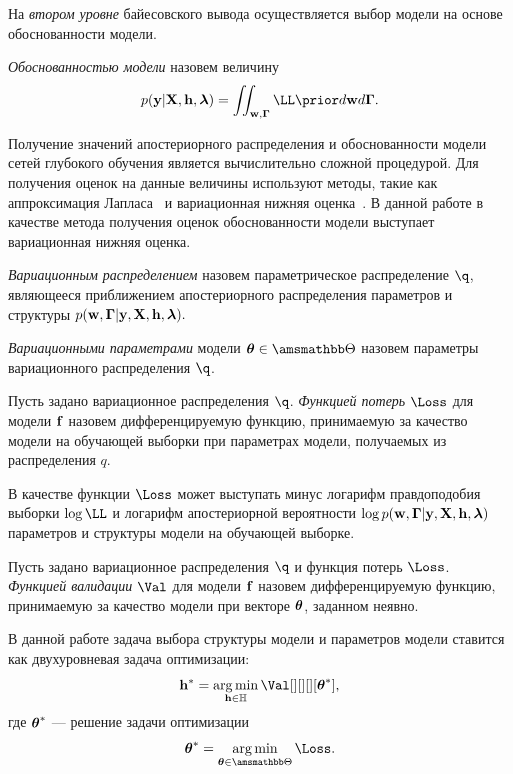 На \textit{втором уровне} байесовского вывода осуществляется выбор модели на основе обоснованности модели.
\begin{defin}
\textit{Обоснованностью модели }назовем величину
\begin{equation}
\label{eq:evidence}
\EV = \iint_{\mathbf{w}, \boldsymbol{\Gamma}} \LL \prior  d\mathbf{w}d\boldsymbol{\Gamma}.
\end{equation}
\end{defin}
Получение значений апостериорного распределения и обоснованности модели сетей глубокого обучения является вычислительно сложной процедурой. Для получения оценок на данные величины используют методы, такие как аппроксимация Лапласа~\cite{tokmakova} и вариационная нижняя оценка~\cite{nips}.  В данной работе в качестве метода получения оценок обоснованности модели выступает вариационная нижняя оценка.

\begin{defin}
\textit{Вариационным распределением} назовем параметрическое распределение $\q$, являющееся приближением  апостериорного распределения параметров и структуры $p(\mathbf{w}, \boldsymbol{\Gamma}|\mathbf{y}, \mathbf{X}, \mathbf{h},\boldsymbol{\lambda}).$ 
\end{defin}

\begin{defin}
\textit{Вариационными параметрами} модели $\teta \in \Tetab$ назовем параметры вариационного распределения $\q$.
\end{defin} 

\begin{defin}
\label{def:l}
Пусть задано вариационное распределения $\q$.
\textit{Функцией потерь} $\Loss$ для модели $\mathbf{f}$ назовем дифференцируемую функцию, принимаемую за качество модели на обучающей выборки при параметрах модели, получаемых из  распределения $q$.
\end{defin}

В качестве функции $\Loss$ может выступать минус логарифм правдоподобия выборки $\log\LL$  и логарифм апостериорной вероятности $\log p(\mathbf{w}, \boldsymbol{\Gamma}|\mathbf{y}, \mathbf{X}, \mathbf{h},\boldsymbol{\lambda})$ параметров и структуры модели на обучающей выборке.

\begin{defin}
\label{def:q}
Пусть задано вариационное распределения $\q$ и функция потерь $\Loss$. 
\textit{Функцией валидации} $\Val$ для модели $\mathbf{f}$ назовем дифференцируемую функцию, принимаемую за качество модели при векторе $\boldsymbol{\theta}$, заданном неявно.
\end{defin}

 

В данной работе задача выбора структуры модели и параметров модели ставится как двухуровневая задача оптимизации:
\begin{equation}
\label{eq:optim_problem}
	\h^{*} = \argmin_{\h  \in \Hb} \Val[][][][\teta^{*}],
\end{equation}
где $\boldsymbol{\theta}^{*}$ --- решение задачи оптимизации
\begin{equation}
\label{eq:optim_problem_in}
   \teta^{*} = \argmin_{\teta \in \Tetab} \Loss.
\end{equation}

